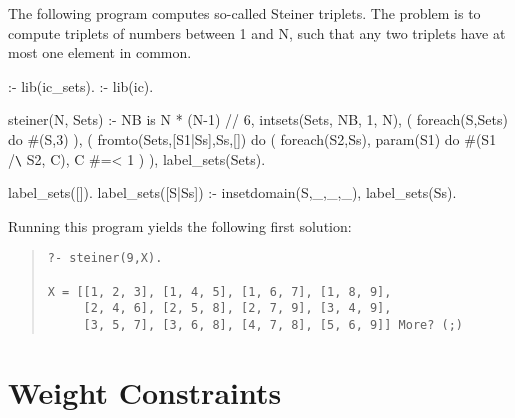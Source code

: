 The following program computes so-called Steiner triplets.
The problem is to compute triplets of numbers between 1 and N,
such that any two triplets have at most one element in common.
\begin{code}
:- lib(ic_sets).
:- lib(ic).

steiner(N, Sets) :-
        NB is N * (N-1) // 6,           %
        intsets(Sets, NB, 1, N),        %
        ( foreach(S,Sets) do
            #(S,3)                      %
        ),
        ( fromto(Sets,[S1|Ss],Ss,[]) do
            ( foreach(S2,Ss), param(S1) do
                #(S1 /\verb.\. S2, C),         %
                C #=< 1                 %
            )
        ),
        label_sets(Sets).               %

label_sets([]).
label_sets([S|Ss]) :-
        insetdomain(S,_,_,_),
        label_sets(Ss).
\end{code}
Running this program yields the following first solution:
\begin{quote}\begin{verbatim}
?- steiner(9,X).

X = [[1, 2, 3], [1, 4, 5], [1, 6, 7], [1, 8, 9],
     [2, 4, 6], [2, 5, 8], [2, 7, 9], [3, 4, 9],
     [3, 5, 7], [3, 6, 8], [4, 7, 8], [5, 6, 9]] More? (;)
\end{verbatim}\end{quote}


\section{Weight Constraints}
\label{weight-constraint}

